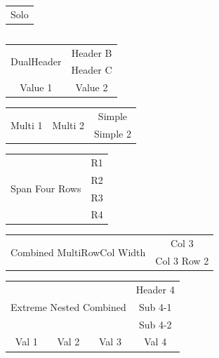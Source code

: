 \documentclass{article}
\begin{document}
\begin{tabular}{c}
  Solo \\
\end{tabular}

\begin{tabular}{c}
  \hline
  \hline
\end{tabular}

\begin{tabular}{cc}
  \toprule
  \multirow{2}{*}{DualHeader} & Header B \\
                              & Header C \\
  \midrule
  Value 1 & Value 2 \\
  \bottomrule
\end{tabular}

\begin{tabular}{ccc}
  \multirow{2}{*}{Multi 1} & \multirow{2}{*}{Multi 2} & Simple \\
                           &                          & Simple 2 \\
\end{tabular}

\begin{tabular}{cc}
  \multirow{4}{*}{Span Four Rows} & R1 \\
                                  & R2 \\
                                  & R3 \\
                                  & R4 \\
\end{tabular}

\begin{tabular}{|ccc|}
  \hline
  \multicolumn{2}{|c|}{\multirow{2}{*}{Combined MultiRowCol Width}} & Col 3 \\
  \multicolumn{2}{|c|}{}                                            & Col 3 Row 2 \\
  \hline
\end{tabular}

\begin{tabular}{|c|c|c|c|}
  \hline
  \multicolumn{3}{|c|}{\multirow{3}{*}{Extreme Nested Combined}} & Header 4 \\
  \multicolumn{3}{|c|}{}                                         & Sub 4-1 \\
  \multicolumn{3}{|c|}{}                                         & Sub 4-2 \\
  \hline
  Val 1 & Val 2 & Val 3 & Val 4 \\
  \hline
\end{tabular}
\end{document}
